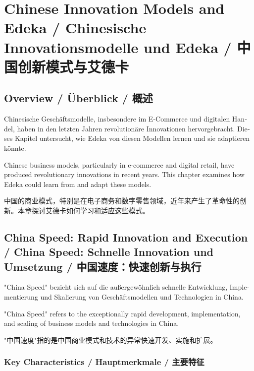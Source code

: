 \chapter{Chinese Innovation Models and Edeka / Chinesische Innovationsmodelle und Edeka / 中国创新模式与艾德卡}

\section{Overview / Überblick / 概述}

\begin{otherlanguage}{ngerman}
Chinesische Geschäftsmodelle, insbesondere im E-Commerce und digitalen Handel, haben in den letzten Jahren revolutionäre Innovationen hervorgebracht. Dieses Kapitel untersucht, wie Edeka von diesen Modellen lernen und sie adaptieren könnte.
\end{otherlanguage}

Chinese business models, particularly in e-commerce and digital retail, have produced revolutionary innovations in recent years. This chapter examines how Edeka could learn from and adapt these models.

中国的商业模式，特别是在电子商务和数字零售领域，近年来产生了革命性的创新。本章探讨艾德卡如何学习和适应这些模式。

\section{China Speed: Rapid Innovation and Execution / China Speed: Schnelle Innovation und Umsetzung / 中国速度：快速创新与执行}

\begin{otherlanguage}{ngerman}
"China Speed" bezieht sich auf die außergewöhnlich schnelle Entwicklung, Implementierung und Skalierung von Geschäftsmodellen und Technologien in China.
\end{otherlanguage}

"China Speed" refers to the exceptionally rapid development, implementation, and scaling of business models and technologies in China.

"中国速度"指的是中国商业模式和技术的异常快速开发、实施和扩展。

\subsection{Key Characteristics / Hauptmerkmale / 主要特征}

